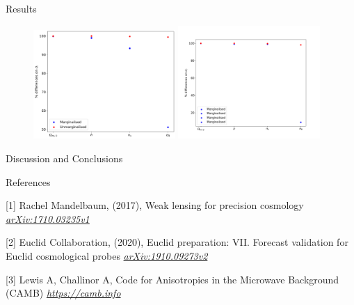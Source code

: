 \begin{frame}[t]
\begin{columns}[t]
\begin{column}{.465\textwidth}
\begin{block}{Results}
\begin{figure}
    \centering
    \includegraphics[width=0.48\textwidth]{fig_results/sigmas.png}
    \includegraphics[width=0.48\textwidth]{fig_results/SIGMAS.png}
    \label{mps}
\end{figure}

\end{block}

\begin{block}{Discussion and Conclusions}


\end{block}


\begin{block}{References}
        

\footnotesize{
\begin{thebibliography}{99}
             [1] Rachel Mandelbaum, (2017),
            \newblock Weak lensing for precision cosmology
            \newblock \emph{\url{arXiv:1710.03235v1}}
            
             [2] Euclid Collaboration, (2020),
            \newblock Euclid preparation: VII. Forecast validation for Euclid cosmological probes
            \newblock \emph{\url{arXiv:1910.09273v2}}

             [3] Lewis A, Challinor A,
            \newblock Code for Anisotropies in the Microwave Background (CAMB)
            \newblock \emph{\url{https://camb.info}}
        \end{thebibliography}
    }


\end{block}
\end{column}
\end{columns}
\end{frame}
